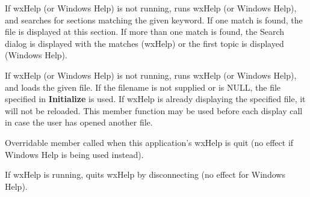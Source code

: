 If wxHelp (or Windows Help) is not running, runs wxHelp (or Windows
Help), and searches for sections matching the given keyword. If one
match is found, the file is displayed at this section. If more than one
match is found, the Search dialog is displayed with the matches (wxHelp)
or the first topic is displayed (Windows Help).



If wxHelp (or Windows Help) is not running, runs wxHelp (or Windows
Help), and loads the given file. If the filename is not supplied or is
NULL, the file specified in {\bf Initialize} is used. If wxHelp is
already displaying the specified file, it will not be reloaded. This
member function may be used before each display call in case the user
has opened another file.



Overridable member called when this application's wxHelp is quit
(no effect if Windows Help is being used instead).



If wxHelp is running, quits wxHelp by disconnecting (no effect for Windows
Help).


